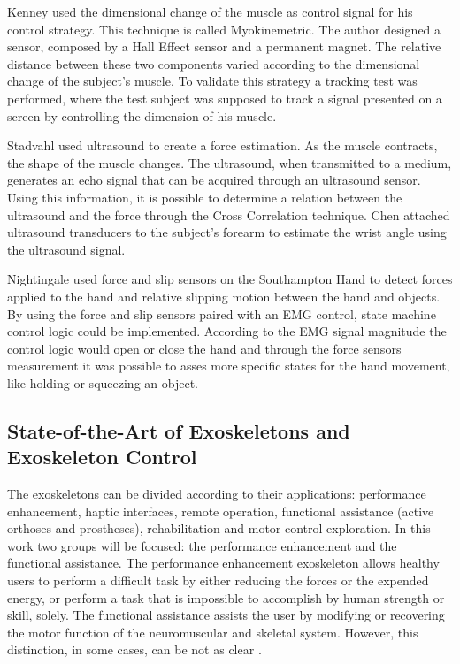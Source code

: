    Kenney \cite{Kenney1999589} used the dimensional change of the muscle as control signal for his control strategy. This technique is called Myokinemetric. The author designed a sensor, composed by a Hall Effect sensor and a permanent magnet. The relative distance between these two components varied according to the dimensional change of the subject's muscle. To validate this strategy a tracking test was performed, where the test subject was supposed to track a signal presented on a screen by controlling the dimension of his muscle.
   
   Stadvahl \cite{Standvahl1997} used ultrasound to create a force estimation. As the muscle contracts, the shape of the muscle changes. The ultrasound, when transmitted to a medium, generates an echo signal that can be acquired through an ultrasound sensor. Using this information, it is possible to determine a relation between the ultrasound and the force through the Cross Correlation technique. Chen \cite{Chen2011} attached ultrasound transducers to the subject's forearm to estimate the wrist angle using the ultrasound signal. 
   
   Nightingale \cite{NIGHTINGALE1985167} used force and slip sensors on the Southampton Hand to detect forces applied to the hand and relative slipping motion between the hand and objects. By using the force and slip sensors paired with an EMG control, state machine control logic could be implemented. According to the EMG signal magnitude the control logic would open or close the hand and through the force sensors measurement it was possible to asses more specific states for the hand movement, like holding or squeezing an object.
   
   \subsection{State-of-the-Art of Exoskeletons and Exoskeleton Control}
   
   The exoskeletons can be divided according to their applications: performance enhancement, haptic interfaces, remote operation, functional assistance (active orthoses and prostheses), rehabilitation and motor control exploration. In this work two groups will be focused: the performance enhancement and the functional assistance. The performance enhancement exoskeleton allows healthy users to perform a difficult task by either reducing the forces or the expended energy, or perform a task that is impossible to accomplish by human strength or skill, solely. The functional assistance assists the user by modifying or recovering the motor function of the neuromuscular and skeletal system. However, this distinction, in some cases, can be not as clear \cite{Dollar4456745}.
   
